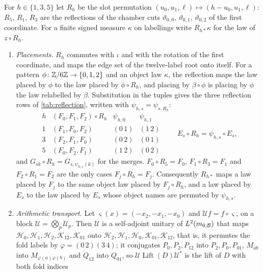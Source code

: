 \begin{lemma}\label{lem:reflection-averaging}
For $h\in\{1,3,5\}$ let $R_h$ be the slot permutation
$(u_0,u_1,\ell)\mapsto(h-u_0,u_1,\ell)$: $R_5$, $R_1$, $R_3$ are the reflections of
the chamber cuts $\vartheta_{0,0}$, $\vartheta_{0,1}$, $\vartheta_{0,2}$ of the first
coordinate. For a finite signed measure $\kappa$ on labellings write
$R_{h*}\kappa$ for the law of $z\circ R_h$.
\begin{enumerate}[label=(\alph*)]
\item \emph{Placements.} $R_h$ commutes with $\iota$ and with the rotation of the
 first coordinate, and maps the edge set of the twelve-label root onto itself.
 For a pattern $\phi\colon\mathbb Z/6\mathbb Z\to\{0,1,2\}$ and an object law $\kappa$, the
 reflection maps the law placed by $\phi$ to the law placed by $\phi\circ R_h$,
 and placing by $\beta\circ\phi$ is placing by $\phi$ the law relabelled by
 $\beta$. Substitution in the tuples gives the three reflection rows of
 \cref{tab:reflection}, written with $\psi_{h,s}=\psi_{s,R_h}$:
 \[
 \begin{array}{c|c|c|c}
  h&(F_0,F_1,F_2)\circ R_h&\psi_{h,0}&\psi_{h,1}\\\hline
  1&(F_1,F_0,F_2)&(0\,1)&(1\,2)\\
  3&(F_2,F_1,F_0)&(0\,2)&(0\,1)\\
  5&(F_0,F_2,F_1)&(1\,2)&(0\,2)
 \end{array}
 \qquad E_s\circ R_h=\psi_{h,s}\circ E_s,
 \]
 and $G_{sk}\circ R_h=G_{s,\psi_{h,s}(k)}$ for the merges. $F_0\circ R_5=F_0$,
 $F_1\circ R_3=F_1$ and $F_2\circ R_1=F_2$ are the only cases $F_j\circ R_h=F_j$.
 Consequently $R_{h*}$ maps a law placed by $F_j$ to the same object law placed
 by $F_j\circ R_h$, and a law placed by $E_s$ to the law placed by $E_s$ whose
 object names are permuted by $\psi_{h,s}$.
\item \emph{Arithmetic transport.} Let $\varsigma(x)=(-x_2,-x_1,-x_0)$ and
 $\mathcal Uf=f\circ\varsigma$, on a block $\mathcal U=\bigotimes_p\mathcal U_p$.
 Then $\mathcal U$ is a self-adjoint unitary of $L^2(m_{0,\mathcal B})$ that maps
 $\mathcal H_0,\mathcal H_1,\mathcal H_2,\mathcal K_{12},\mathcal K_{01}$ onto
 $\mathcal H_2,\mathcal H_1,\mathcal H_0,\mathcal K_{01},\mathcal K_{12}$, that is, it permutes
 the fold labels by $\varphi=(0\,2)(3\,4)$; it conjugates $P_0,P_2,P_{12}$ into
 $P_2,P_0,P_{01}$, $M_{ab}$ into $M_{\varphi(a)\varphi(b)}$ and $Q_{12}$ into $Q_{01}$, so
 $\mathcal U\operatorname{Lift}(D)\mathcal U^*$ is the lift of $D$ with both fold indices

\end{enumerate}
\end{lemma}

